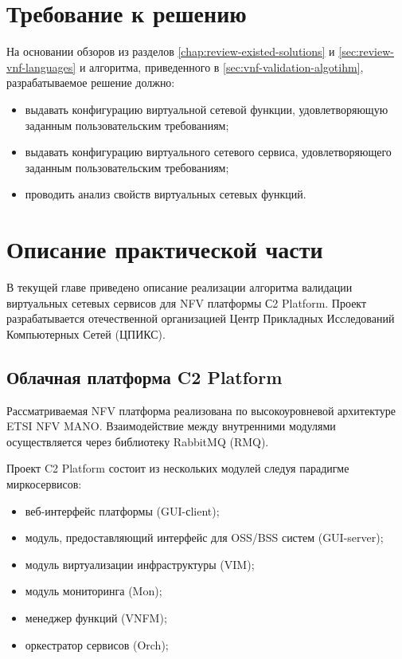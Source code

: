 \documentclass[oneside,final,14pt,a4paper]{extreport}
\begin{document}
\chapter{Требование к решению}
На основании обзоров из разделов \ref{chap:review-existed-solutions} и \ref{sec:review-vnf-languages} и алгоритма, приведенного в \ref{sec:vnf-validation-algotihm}, разрабатываемое решение должно:
\begin{itemize}
    \item выдавать конфигурацию виртуальной сетевой функции, удовлетворяющую заданным пользовательским требованиям;
    \item выдавать конфигурацию виртуального сетевого сервиса, удовлетворяющего заданным пользовательским требованиям;
    \item проводить анализ свойств виртуальных сетевых функций.
\end{itemize}





\chapter{Описание практической части}
\label{chap:practice}
В текущей главе приведено описание реализации алгоритма валидации виртуальных сетевых сервисов для NFV платформы С2 Platform\cite{bib:c2-platform}. Проект разрабатывается отечественной организацией Центр Прикладных Исследований Компьютерных Сетей (ЦПИКС)\cite{bib:arccn}.


\section{Облачная платформа C2 Platform}
\label{sec:c2-platform-description}
Рассматриваемая NFV платформа реализована по высокоуровневой архитектуре ETSI NFV MANO. Взаимодействие между внутренними модулями осуществляется через библиотеку RabbitMQ\cite{bib:rabbitmq} (RMQ). 

Проект C2 Platform состоит из нескольких модулей следуя парадигме миркосервисов:
\begin{itemize}
	\item веб-интерфейс платформы (GUI-сlient);
	\item модуль, предоставляющий интерфейс для OSS/BSS систем (GUI-server);
	\item модуль виртуализации инфраструктуры (VIM);
	\item модуль мониторинга (Mon);
	\item менеджер функций (VNFM);
	\item оркестратор сервисов (Orch);
\end{itemize}
\end{document}
